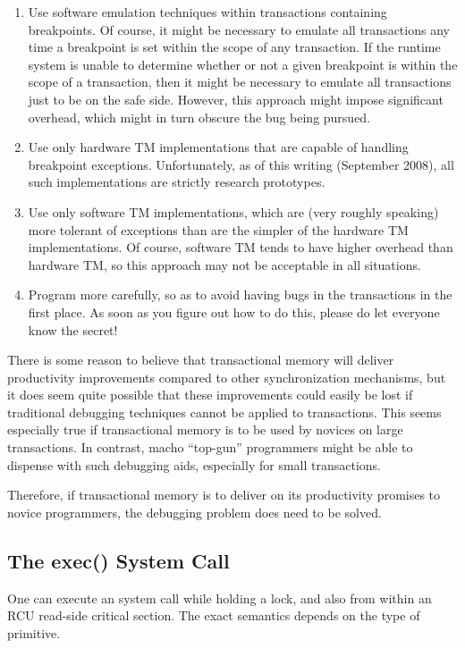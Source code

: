 \begin{enumerate}
\item	Use software emulation techniques within transactions containing
	breakpoints.
	Of course, it might be necessary to emulate all transactions
	any time a breakpoint is set within the scope of any transaction.
	If the runtime system is unable to determine whether or not a
	given breakpoint is within the scope of a transaction, then it
	might be necessary to emulate all transactions just to be on
	the safe side.
	However, this approach might impose significant overhead, which
	might in turn obscure the bug being pursued.
\item	Use only hardware TM implementations that are capable of
	handling breakpoint exceptions.
	Unfortunately, as of this writing (September 2008), all such
	implementations are strictly research prototypes.
\item	Use only software TM implementations, which are
	(very roughly speaking) more tolerant of exceptions than are
	the simpler of the hardware TM implementations.
	Of course, software TM tends to have higher overhead than hardware
	TM, so this approach may not be acceptable in all situations.
\item	Program more carefully, so as to avoid having bugs in the
	transactions in the first place.
	As soon as you figure out how to do this, please do let everyone
	know the secret!
\end{enumerate}

There is some reason to believe that transactional memory will deliver
productivity improvements compared to other synchronization mechanisms,
but it does seem quite possible that these improvements could easily
be lost if traditional debugging techniques cannot be applied to
transactions.
This seems especially true if transactional memory is to be used by
novices on large transactions.
In contrast, macho ``top-gun'' programmers might be able to dispense with
such debugging aids, especially for small transactions.

Therefore, if transactional memory is to deliver on its productivity
promises to novice programmers, the debugging problem does need to
be solved.

\subsection{The exec() System Call}
\label{sec:future:The exec System Call}

One can execute an  system call while holding a lock, and
also from within an RCU read-side critical section.
The exact semantics depends on the type of primitive.

